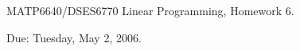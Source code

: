 \documentclass[12pt]{article}
\begin{document}
\begin{center}
  \begin{large}
     MATP6640/DSES6770 Linear Programming, Homework 6.
  \end{large}
\end{center}

\begin{flushright}
   Due:  Tuesday, May 2, 2006.
\end{flushright}



\end{document}
